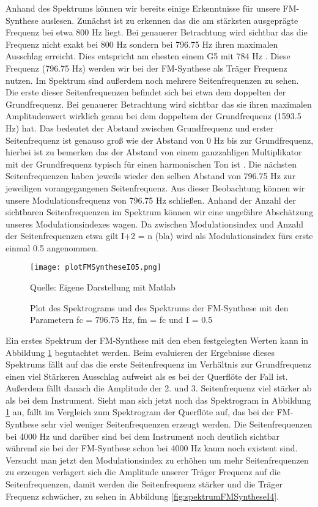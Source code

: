 Anhand des Spektrums können wir bereits einige Erkenntnisse für unsere FM-Synthese auslesen. Zunächst ist zu erkennen das die am stärksten ausgeprägte Frequenz bei etwa 800 Hz liegt. Bei genauerer Betrachtung wird sichtbar das die Frequenz nicht exakt bei 800 Hz sondern bei 796.75 Hz ihren maximalen Ausschlag erreicht. Dies entspricht am ehesten einem G5 mit 784 Hz \cite[S. 181]{borucki}. Diese Frequenz (796.75 Hz) werden wir bei der FM-Synthese als Träger Frequenz nutzen. Im Spektrum sind außerdem noch mehrere Seitenfrequenzen zu sehen. Die erste dieser Seitenfrequenzen befindet sich bei etwa dem doppelten der Grundfrequenz. Bei genauerer Betrachtung wird sichtbar das sie ihren maximalen Amplitudenwert wirklich genau bei dem doppeltem der Grundfrequenz (1593.5 Hz) hat. Das bedeutet der Abstand zwischen Grundfrequenz und erster Seitenfrequenz ist genauso groß wie der Abstand von 0 Hz bis zur Grundfrequenz, hierbei ist zu bemerken das der Abstand von einem ganzzahligen Multiplikator mit der Grundfrequenz typisch für einen harmonischen Ton ist \cite[S. 528]{chowningPaper}. Die nächsten Seitenfrequenzen haben jeweils wieder den selben Abstand von 796.75 Hz zur jeweiligen vorangegangenen Seitenfrequenz. Aus dieser Beobachtung können wir unsere Modulationsfrequenz von 796.75 Hz schließen. Anhand der Anzahl der sichtbaren Seitenfrequenzen im Spektrum können wir eine ungefähre Abschätzung unseres Modulationsindexes wagen. Da zwischen Modulationsindex und Anzahl der Seitenfrequenzen etwa gilt I+2 = n (bla) wird als Modulationsindex fürs erste einmal 0.5 angenommen. 

\begin{figure} [ht]
\centering
  \texttt{[image: plotFMSyntheseI05.png]}
\caption{Plot des Spektrograms und des Spektrums der FM-Synthese mit den Parametern fc = 796.75 Hz, fm = fc und I = 0.5 }
\label{fig:plotFMSyntheseI05}
Quelle: Eigene Darstellung mit Matlab
\end{figure}

Ein erstes Spektrum der FM-Synthese mit den eben festgelegten Werten kann in Abbildung \ref{fig:plotFMSyntheseI05} begutachtet werden. Beim evaluieren der Ergebnisse dieses Spektrums fällt auf das die erste Seitenfrequenz im Verhältnis zur Grundfrequenz einen viel Stärkeren Ausschlag aufweist als es bei der Querflöte der Fall ist. Außerdem fällt danach die Amplitude der 2. und 3. Seitenfrequenz viel stärker ab als bei dem Instrument. Sieht man sich jetzt noch das Spektrogram in Abbildung \ref{fig:plotFMSyntheseI05} an, fällt im Vergleich zum Spektrogram der Querflöte auf, das bei der FM-Synthese sehr viel weniger Seitenfrequenzen erzeugt werden. Die Seitenfrequenzen bei 4000 Hz und darüber sind bei dem Instrument noch deutlich sichtbar während sie bei der FM-Synthese schon bei 4000 Hz kaum noch existent sind. Versucht man jetzt den Modulationsindex zu erhöhen um mehr Seitenfrequenzen zu erzeugen verlagert sich die Amplitude unserer Träger Frequenz auf die Seitenfrequenzen, damit werden die Seitenfrequenz stärker und die Träger Frequenz schwächer, zu sehen in Abbildung \ref{fig:spektrumFMSyntheseI4}.

